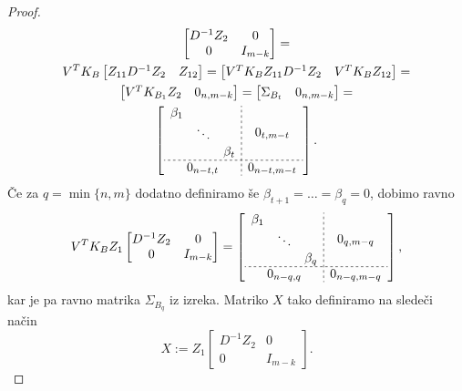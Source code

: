 \documentclass[mat1]{article}
\begin{document}
\begin{proof}
\begin{gather*}
\begin{bmatrix}
D^{-1} Z_2 & 0\\ 
0 & I_{m-k}
\end{bmatrix} = \\
V^T K_B
\begin{bmatrix}
 Z_{11} D^{-1} Z_2 & Z_{12} 
\end{bmatrix} =
\begin{bmatrix}
V^T K_B Z_{11} D^{-1} Z_2 & V^T K_B Z_{12} 
\end{bmatrix} = \\
\begin{bmatrix}
V^T K_{B_1} Z_2 & 0_{n, m-k} 
\end{bmatrix} =
\begin{bmatrix}
\Sigma_{B_t} & 0_{n, m-k} 
\end{bmatrix} = \\
\left[
\begin{array}{c;{2pt/2pt}c}
\begin{matrix}
\beta_1 & & \\
 & \ddots & \\
 & & \beta_t
\end{matrix} & 0_{t, m - t}
 \\ \hdashline[2pt/2pt]
0_{n-t, t} & 0_{n-t, m-t}
\end{array} \right]
\text{.}
\end{gather*}
Če za $q = \min\{n,m\}$ dodatno definiramo še $\beta_{t+1} = \ldots = \beta_{q} = 0$, dobimo ravno
\begin{gather*}
V^T K_B Z_1
\begin{bmatrix}
D^{-1} Z_2 & 0\\ 
0 & I_{m-k}
\end{bmatrix} = 
\left[
\begin{array}{c;{2pt/2pt}c}
\begin{matrix}
\beta_1 & & \\
 & \ddots & \\
 & & \beta_q
\end{matrix} & 0_{q, m - q}
 \\ \hdashline[2pt/2pt]
0_{n-q, q} & 0_{n-q, m-q}
\end{array} \right]
\text{,}
\end{gather*}
kar je pa ravno matrika $\Sigma_{B_q}$ iz izreka. Matriko $X$ tako definiramo na sledeči način
$$ X := Z_1 
\begin{bmatrix}
D^{-1} Z_2 & 0\\ 
0 & I_{m-k}
\end{bmatrix}
\text{.}$$


\end{proof}
\end{document}
